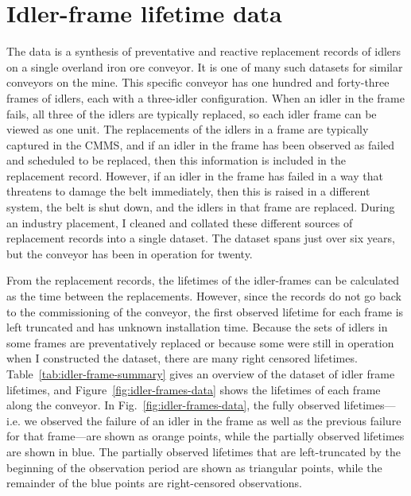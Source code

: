 \section{Idler-frame lifetime data} \label{sec:idler-frame-data-desc}

The data is a synthesis of preventative and reactive replacement records of idlers on a single overland iron ore conveyor. It is one of many such datasets for similar conveyors on the mine. This specific conveyor has one hundred and forty-three frames of idlers, each with a three-idler configuration. When an idler in the frame fails, all three of the idlers are typically replaced, so each idler frame can be viewed as one unit. The replacements of the idlers in a frame are typically captured in the CMMS, and if an idler in the frame has been observed as failed and scheduled to be replaced, then this information is included in the replacement record. However, if an idler in the frame has failed in a way that threatens to damage the belt immediately, then this is raised in a different system, the belt is shut down, and the idlers in that frame are replaced. During an industry placement, I cleaned and collated these different sources of replacement records into a single dataset. The dataset spans just over six years, but the conveyor has been in operation for twenty.

From the replacement records, the lifetimes of the idler-frames can be calculated as the time between the replacements. However, since the records do not go back to the commissioning of the conveyor, the first observed lifetime for each frame is left truncated and has unknown installation time. Because the sets of idlers in some frames are preventatively replaced or because some were still in operation when I constructed the dataset, there are many right censored lifetimes. Table~\ref{tab:idler-frame-summary} gives an overview of the dataset of idler frame lifetimes, and Figure~\ref{fig:idler-frames-data} shows the lifetimes of each frame along the conveyor. In Fig.~\ref{fig:idler-frames-data}, the fully observed lifetimes---i.e. we observed the failure of an idler in the frame as well as the previous failure for that frame---are shown as orange points, while the partially observed lifetimes are shown in blue. The partially observed lifetimes that are left-truncated by the beginning of the observation period are shown as triangular points, while the remainder of the blue points are right-censored observations.



